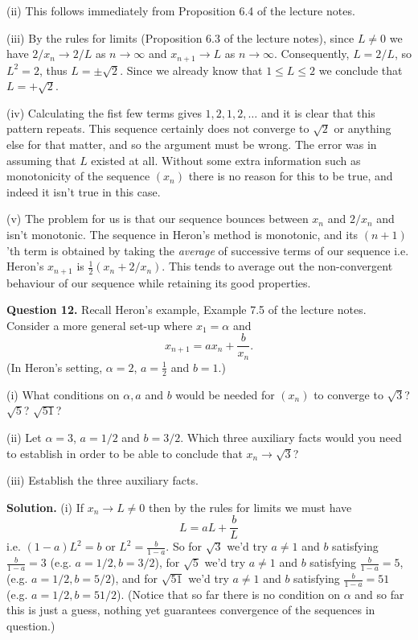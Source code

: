 \documentclass[12pt]{article}
\begin{document}
(ii) This follows immediately from Proposition 6.4 of the lecture notes.

(iii) By the rules for limits (Proposition 6.3 of the lecture notes), since $L \neq 0$ we have $2/x_n \to 2/L$ as $n \to \infty$ and $x_{n+1} \to L$ as $n \to \infty$. Consequently, $L = 2/L$, so $L^2 = 2$, thus $L = \pm \sqrt{2}$. Since we already know that $1 \leq L \leq 2$ we conclude that $L = +\sqrt{2}$. 

(iv) Calculating the fist few terms gives $1,2,1,2, \dots$ and it is clear that this pattern repeats. This sequence certainly does not converge to $\sqrt{2}$ or anything else for that matter, and so the argument must be wrong. The error was in assuming that $L$ existed at all. Without some extra information such as monotonicity of the sequence $(x_n)$ there is no reason for this to be true, and indeed it isn't true in this case.  

(v) The problem for us is that our sequence bounces between $x_n$ and $2/x_n$ and isn't monotonic. The sequence in Heron's method is monotonic, and its $(n+1)$'th term is obtained by taking the {\em average} of successive terms of our sequence i.e. Heron's $x_{n+1}$ is $\frac{1}{2} (x_n + 2/x_n)$. This tends to average out the non-convergent behaviour of our sequence while retaining its good properties.


\bigskip
\noindent
{\bf Question 12.} Recall Heron's example, Example 7.5 of the lecture notes. Consider a 
more general set-up where $x_1 = \alpha$
and 
\[ x_{n+1} = a x_n + \frac{b}{x_n}.\]
(In Heron's setting, $\alpha = 2$, $a = \frac{1}{2}$ and $b=1$.)

(i) What conditions on $\alpha, a$ and $b$ would be needed for $(x_n)$ to converge to  $\sqrt{3}$? $\sqrt{5}$? $\sqrt{51}$?

(ii) Let $\alpha = 3$, $a = 1/2$ and $b = 3/2$. Which three auxiliary facts would you need to establish in order to be able to conclude that $x_n \to \sqrt{3}$?

(iii) Establish the three auxiliary facts.

{\bf Solution.} (i) If $x_n \to L \neq 0$ then by the rules for limits we must have
\[ L = a L + \frac{b}{L}\]
i.e. $ (1-a)L^2 = b$ or $L^2 = \frac{b}{1-a}$.
So for $\sqrt{3}$ we'd try $a \neq 1$ and $b$ satisfying $\frac{b}{1-a} = 3$ (e.g. $a = 1/2, b= 3/2$), for $\sqrt{5}$ we'd try $a \neq 1$ and $b$ satisfying $\frac{b}{1-a} = 5$, (e.g. $a = 1/2, b= 5/2$), and for $\sqrt{51}$ we'd try $a \neq 1$ and $b$ satisfying $\frac{b}{1-a} = 51$ (e.g. $a = 1/2, b= 51/2$). (Notice that so far there is no condition on $\alpha$ and so far this is just a guess, nothing yet guarantees convergence of the sequences in question.)
\end{document}
